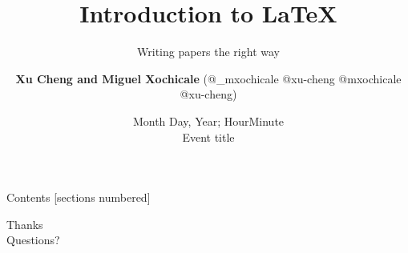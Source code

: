 \documentclass[xcolor={dvipsnames},aspectratio=169,10pt]{beamer}
\title{Introduction to \LaTeX}
\subtitle{Writing papers the right way}
\author{
{\bf Xu Cheng and  Miguel Xochicale}
(\faTwitter @\_mxochicale @xu-cheng
\faGithub @mxochicale @xu-cheng)
}
\date{Month Day, Year; HourMinute\\
	Event title}
\institute{School of Eng \\{\bf University of X, Earth}}
\begin{document}
\maketitle

\begin{frame}{Contents}
  [sections numbered]
  \tableofcontents[hideallsubsections]
\end{frame}






\begin{frame}[standout]
  Thanks \\
  Questions?
\end{frame}
\end{document}
